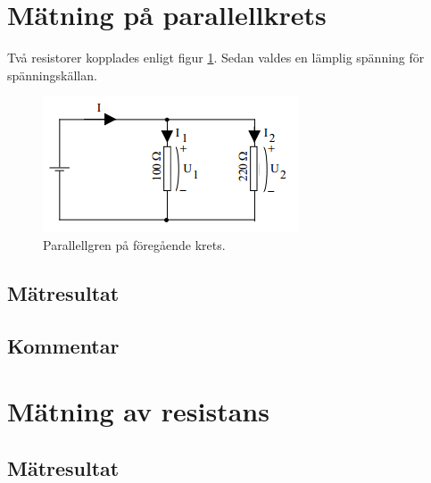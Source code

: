 \documentclass[11pt,a4paper]{article}
\begin{document}
\section{Mätning på parallellkrets}\label{}
Två resistorer kopplades enligt figur \ref{fig:3-mm-schem}.
Sedan valdes en lämplig spänning för spänningskällan.

\begin{figure}[htbp]
    \centering
        \includegraphics[scale=1]{misc/krets3.png}
    \caption{Parallellgren på föregående krets.}
    \label{fig:3-mm-schem}
\end{figure}
\subsection{Mätresultat}\label{}

\subsection{Kommentar}\label{}


\section{Mätning av resistans}\label{}

\subsection{Mätresultat}\label{}
\end{document}
